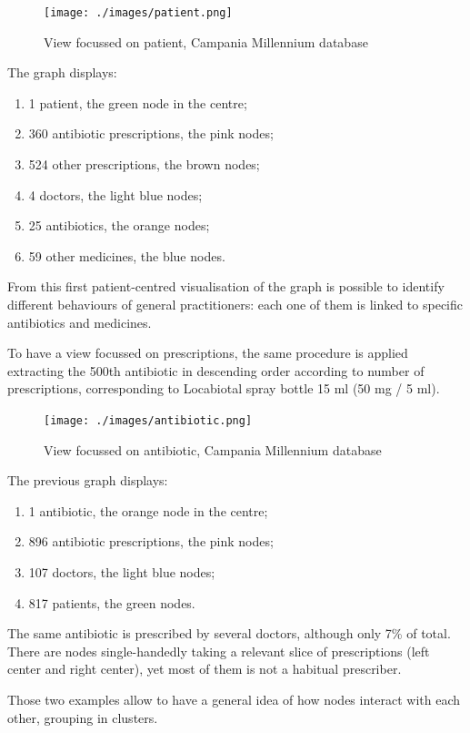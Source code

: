 \begin{figure}[h]
	\centering
	\texttt{[image: ./images/patient.png]}
	\caption{\small View focussed on patient, Campania Millennium database}
\end{figure}

The graph displays:
\begin{enumerate}
	\item 1 patient, the green node in the centre;
	\item 360 antibiotic prescriptions, the pink nodes;
	\item 524 other prescriptions, the brown nodes;
	\item 4 doctors, the light blue nodes;
	\item 25 antibiotics, the orange nodes;
	\item 59 other medicines, the blue nodes. 
\end{enumerate}

From this first patient-centred visualisation of the graph is possible to identify different behaviours of general practitioners: each one of them is linked to specific antibiotics and medicines.

To have a view focussed on prescriptions, the same procedure is applied extracting the 500th antibiotic in descending order according to number of prescriptions, corresponding to Locabiotal spray bottle 15 ml (50 mg / 5 ml).

\begin{figure}[h]
	\centering
	\texttt{[image: ./images/antibiotic.png]}
	\caption{\small View focussed on antibiotic, Campania Millennium database}
\end{figure}

The previous graph displays:
\begin{enumerate}
	\item 1 antibiotic, the orange node in the centre;
	\item 896 antibiotic prescriptions, the pink nodes;
	\item 107 doctors, the light blue nodes;
	\item 817 patients, the green nodes.
\end{enumerate}

The same antibiotic is prescribed by several doctors, although only 7\% of total. There are nodes single-handedly taking a relevant slice of prescriptions (left center and right center), yet most of them is not a habitual prescriber.

Those two examples allow to have a general idea of how nodes interact with each other, grouping in clusters. 

